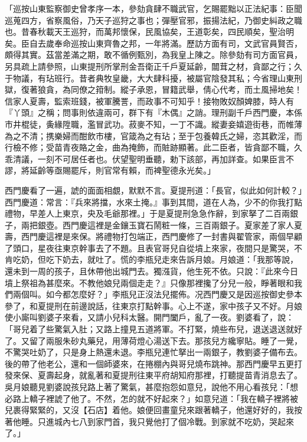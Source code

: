 「巡按山東監察御史曾孝序一本，參劾貪肆不職武官，乞賜罷黜以正法紀事：臣聞巡蒐四方，省察風俗，乃天子巡狩之事也；彈壓官邪，振揚法紀，乃御史糾政之職也。昔春秋載天王巡狩，而萬邦懷保，民風協矣，王道彰矣，四民順矣，聖治明矣。臣自去歲奉命巡按山東齊魯之邦，一年將滿。歷訪方面有司，文武官員賢否，頗得其實。茲當差滿之期，敢不循例甄別，為我皇上陳之。除參劾有司方面官員，另具疏上請參照，山東提刑所掌刑金吾衛正千戶夏延齡，闒茸之材，貪鄙之行；久于物議，有玷班行。昔者典牧皇畿，大大肆科擾，被屬官陰發其私；今省理山東刑獄，復著狼貪，為同僚之箝制。縱子承恩，冒籍武舉，倩心代考，而土風掃地矣！信家人夏壽，監索班錢，被軍騰詈，而政事不可知乎！接物敗奴顏婢膝，時人有『丫頭』之稱；問事則依違兩可，群下有『木偶』之誚。理刑副千戶西門慶，本係市井棍徒，夤緣陞職，濫冒武功。菽麥不知，一丁不識。縱妻妾嬉遊街巷，而帷薄為之不清；携樂婦而酣飲市樓，官箴為之有玷；至于包養韓氏之婦，恣其歡淫，而行檢不修；受苗青夜賂之金，曲為掩飾，而賍跡顯著。此二臣者，皆貪鄙不職，久乖清議，一刻不可居任者也。伏望聖明垂聽，勅下該部，再加詳查。如果臣言不謬，將延齡等亟賜罷斥，則官常有賴，而裨聖德永光矣。」

西門慶看了一遍，諕的面面相覷，默默不言。夏提刑道：「長官，似此如何計較？」西門慶道：常言：『兵來將擋，水來土掩。』事到其間，道在人為，少不的你我打點禮物，早差人上東京，央及毛爺那裡。」于是夏提刑急急作辭，到家拏了二百兩銀子，兩把銀壺。西門慶這裡是金鑲玉寶石鬧粧一條，三百兩銀子。夏家差了家人夏壽，西門慶這裡是來保。將禮物打包端正，西門慶修了一封書與翟管家，兩個早顧了頭口，星夜往東京幹事去了不題。且表官哥兒自從墳上來家，夜間只是驚哭，不肯吃奶，但吃下奶去，就吐了。慌的李瓶兒走來告訴月娘。月娘道：「我那等說，還未到一周的孩子，且休帶他出城門去。獨漒貨，他生死不依。只說：『此來今日墳上祭祖為甚麼來。不教他娘兒兩個走走？』只像那裡攙了分兒一般，睜著眼和我們兩個叫。如今都怎麼好？」李瓶兒正沒法兒擺佈。况西門慶又是因巡按御史參本參了，和夏提刑在前邊說話，往東京打點幹事。心上不遂，家中孩子又不好。月娘使小廝叫劉婆子來看，又請小兒科太醫。開門闔戶，亂了一夜。劉婆看了，說：「哥兒着了些驚氣入肚；又路上撞見五道將軍。不打緊，燒些布兒，退送退送就好了。又留了兩服朱砂丸藥兒，用薄荷燈心湯送下去。那孩兒方纔寧貼。睡了一覺，不驚哭吐奶了，只是身上熱還未退。李瓶兒連忙拏出一兩銀子，教劉婆子備布去。後的帶了他老公，還和一個師婆來，在捲棚內與哥兒燒布跳神。那西門慶早五更打發來保、夏壽起身，就亂著和夏提刑往東平府胡知府那裡，打聽提苗青消息去了。吳月娘聽見劉婆說孩兒路上著了驚氣，甚麼抱怨如意兒，說他不用心看孩兒：「想必路上轎子裡諕了他了。不然，怎的就不好起來？」如意兒道：「我在轎子裡將被兒裹得緊緊的，又沒【石店】着他。娘便回畫童兒來跟著轎子，他還好好的，我按著他睡。只進城內七八到家門首，我只覺他打了個冷戰。到家就不吃奶，哭起來了。」

